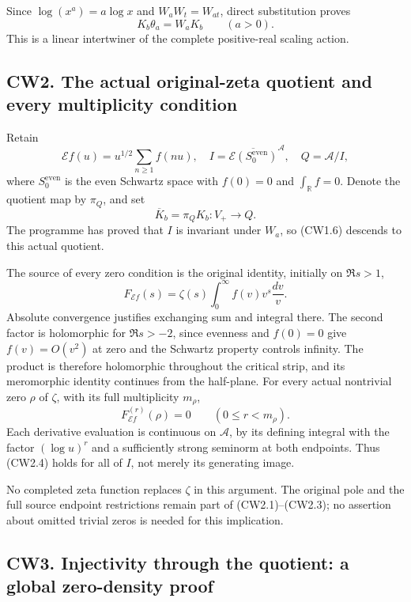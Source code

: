 Since \(\log(x^a)=a\log x\) and \(W_aW_t=W_{at}\), direct substitution
proves \[
K_b\theta_a=W_aK_b\qquad(a>0).
\tag{CW1.6}
\] This is a linear intertwiner of the complete positive-real scaling
action.

\subsection{CW2. The actual original-zeta quotient and every
multiplicity
condition}\label{cw2.-the-actual-original-zeta-quotient-and-every-multiplicity-condition}

Retain \[
\mathcal E f(u)=u^{1/2}\sum_{n\ge1}f(nu),\quad
I=\overline{\mathcal E(S_0^{\mathrm{even}})}^{\mathcal A},\quad
Q=\mathcal A/I,
\tag{CW2.1}
\] where \(S_0^{\mathrm{even}}\) is the even Schwartz space with
\(f(0)=0\) and \(\int_{\mathbb R}f=0\). Denote the quotient map by
\(\pi_Q\), and set \[
\overline K_b=\pi_QK_b:V_+\longrightarrow Q.
\tag{CW2.2}
\] The programme has proved that \(I\) is invariant under \(W_a\), so
(CW1.6) descends to this actual quotient.

The source of every zero condition is the original identity, initially
on \(\Re s>1\), \[
F_{\mathcal E f}(s)
=\zeta(s)\int_0^\infty f(v)v^s\frac{dv}{v}.
\tag{CW2.3}
\] Absolute convergence justifies exchanging sum and integral there. The
second factor is holomorphic for \(\Re s>-2\), since evenness and
\(f(0)=0\) give \(f(v)=O(v^2)\) at zero and the Schwartz property
controls infinity. The product is therefore holomorphic throughout the
critical strip, and its meromorphic identity continues from the
half-plane. For every actual nontrivial zero \(\rho\) of \(\zeta\), with
its full multiplicity \(m_\rho\), \[
F_{\mathcal E f}^{(r)}(\rho)=0\qquad(0\le r<m_\rho).
\tag{CW2.4}
\] Each derivative evaluation is continuous on \(\mathcal A\), by its
defining integral with the factor \((\log u)^r\) and a sufficiently
strong seminorm at both endpoints. Thus (CW2.4) holds for all of \(I\),
not merely its generating image.

No completed zeta function replaces \(\zeta\) in this argument. The
original pole and the full source endpoint restrictions remain part of
(CW2.1)--(CW2.3); no assertion about omitted trivial zeros is needed for
this implication.

\subsection{CW3. Injectivity through the quotient: a global zero-density
proof}\label{cw3.-injectivity-through-the-quotient-a-global-zero-density-proof}

